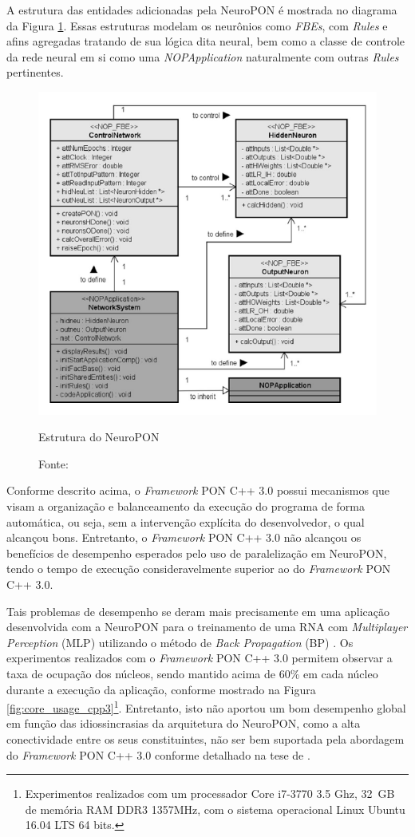 A estrutura das entidades adicionadas pela NeuroPON é mostrada no diagrama da
Figura \ref{fig:neuro_struct}. Essas estruturas modelam os neurônios como
\textit{FBEs}, com \textit{Rules} e afins agregadas tratando de sua lógica dita
neural, bem como a classe de controle da rede neural em si como uma
\textit{NOPApplication} naturalmente com outras \textit{Rules} pertinentes.

\begin{figure}[!htb]
  \centering
  \includegraphics[width=.6\textwidth]{../figures/neuropon_struct.png}
  \caption{Estrutura do NeuroPON}
  \caption*{Fonte: }
  \label{fig:neuro_struct}
\end{figure}

Conforme descrito acima, o \textit{Framework} PON C++ 3.0 possui mecanismos que
visam a organização e balanceamento da execução do programa de forma automática,
ou seja, sem a intervenção explícita do desenvolvedor, o qual alcançou bons.
Entretanto, o \textit{Framework} PON C++ 3.0 não alcançou os benefícios de
desempenho esperados pelo uso de paralelização em NeuroPON, tendo o tempo de
execução consideravelmente superior ao do \textit{Framework} PON C++ 3.0.

Tais problemas de desempenho se deram mais precisamente em uma aplicação
desenvolvida com a NeuroPON para o treinamento de uma RNA com
\textit{Multiplayer Perception} (MLP) utilizando o método de \textit{Back
Propagation} (BP) \cite{schutz_2018}. Os experimentos realizados com o
\textit{Framework} PON C++ 3.0 permitem observar a taxa de ocupação dos núcleos,
sendo mantido acima de 60\% em cada núcleo durante a execução da aplicação,
conforme mostrado na Figura \ref{fig:core_usage_cpp3}\footnote{Experimentos
realizados com um processador Core i7-3770 3.5 Ghz, 32 GB de memória RAM DDR3
1357MHz, com o sistema operacional Linux Ubuntu 16.04 LTS 64 bits.}. Entretanto,
isto não aportou um bom desempenho global em função das idiossincrasias da
arquitetura do NeuroPON, como a alta conectividade entre os seus constituintes,
não ser bem suportada pela abordagem do \textit{Framework} PON C++ 3.0 conforme
detalhado na tese de .

